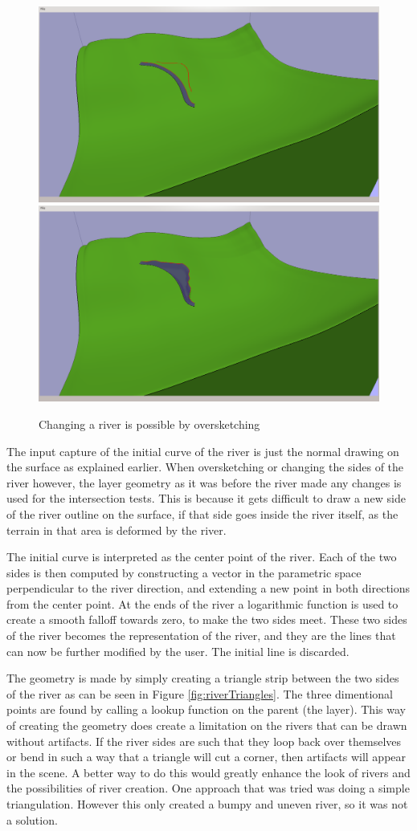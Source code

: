 \documentclass[a4paper,12pt]{report}
\begin{document}
\begin{figure}
\includegraphics[trim = 30mm 80mm 120mm 30mm, clip,width=.5\linewidth]{thesis/results/riverChange.png}
\includegraphics[trim = 30mm 80mm 120mm 30mm, clip,width=.5\linewidth]{thesis/results/riverChanged.png}
 \caption{Changing a river is possible by oversketching }
 \label{fig:riverChange}
\end{figure}

The input capture of the initial curve of the river is just the normal drawing on the surface as explained earlier. When oversketching or changing the sides of the river however, the layer geometry as it was before the river made any changes is used for the intersection tests. This is because it gets difficult to draw a new side of the river outline on the surface, if that side goes inside the river itself, as the terrain in that area is deformed by the river.

The initial curve is interpreted as the center point of the river. Each of the two sides is then computed by constructing a vector in the parametric space perpendicular to the river direction, and extending a new point in both directions from the center point. At the ends of the river a logarithmic function is used to create a smooth falloff towards zero, to make the two sides meet. These two sides of the river becomes the representation of the river, and they are the lines that can now be further modified by the user. The initial line is discarded.

The geometry is made by simply creating a triangle strip between the two sides of the river as can be seen in Figure \ref{fig:riverTriangles}. The three dimentional points are found by calling a lookup function on the parent (the layer). This way of creating the geometry does create a limitation on the rivers that can be drawn without artifacts. If the river sides are such that they loop back over themselves or bend in such a way that a triangle will cut a corner, then artifacts will appear in the scene. A better way to do this would greatly enhance the look of rivers and the possibilities of river creation. One approach that was tried was doing a simple triangulation. However this only created a bumpy and uneven river, so it was not a solution.
\end{document}
